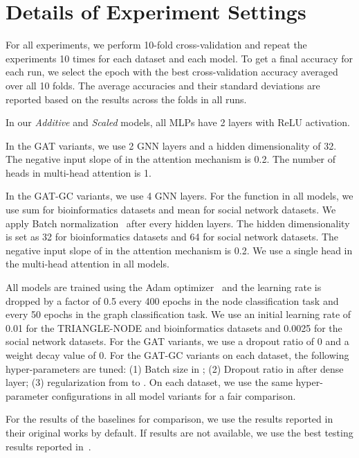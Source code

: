 \documentclass[letterpaper]{article} \usepackage{aaai20}  \usepackage{times}  \usepackage{helvet} \usepackage{courier}  \usepackage[hyphens]{url}  \usepackage{graphicx} \urlstyle{rm} \def\UrlFont{\rm}  \usepackage{graphicx}  \frenchspacing  \setlength{\pdfpagewidth}{8.5in}  \setlength{\pdfpageheight}{11in}
\theoremstyle{plain}
\theoremstyle{definition}
\begin{document}
\section{Details of Experiment Settings}
For all experiments, we perform 10-fold cross-validation and repeat the experiments 10 times for each dataset and each model. To get a final accuracy for each run, we select the epoch with the best cross-validation accuracy averaged over all 10 folds. The average accuracies and their standard deviations are reported based on the results across the folds in all runs.

In our \textit{Additive} and \textit{Scaled} models, all MLPs have 2 layers with ReLU activation.

In the GAT variants, we use 2 GNN layers and a hidden dimensionality of 32. The negative input slope of  in the  attention mechanism is 0.2. The number of heads in multi-head attention is 1.

In the GAT-GC variants, we use 4 GNN layers. For the  function in all models, we use sum for bioinformatics datasets and mean for social network datasets. We apply Batch normalization~\cite{ioffe2015batch} after every hidden layers. The hidden dimensionality is set as 32 for bioinformatics datasets and 64 for social network datasets. The negative input slope of  in the  attention mechanism is 0.2. We use a single head in the multi-head attention in all models.

All models are trained using the Adam optimizer~\cite{kingma2014adam} and the learning rate is dropped by a factor of 0.5 every 400 epochs in the node classification task and every 50 epochs in the graph classification task. We use an initial learning rate of 0.01 for the TRIANGLE-NODE and bioinformatics datasets and 0.0025 for the social network datasets. For the GAT variants, we use a dropout ratio of 0 and a weight decay value of 0. For the GAT-GC variants on each dataset, the following hyper-parameters are tuned: (1) Batch size in ; (2) Dropout ratio in  after dense layer; (3)  regularization from  to . On each dataset, we use the same hyper-parameter configurations in all model variants for a fair comparison.

For the results of the baselines for comparison, we use the results reported in their original works by default. If results are not available, we use the best testing results reported in~\cite{xinyi2019capsule,ivanov2018anonymous}.
\end{document}
